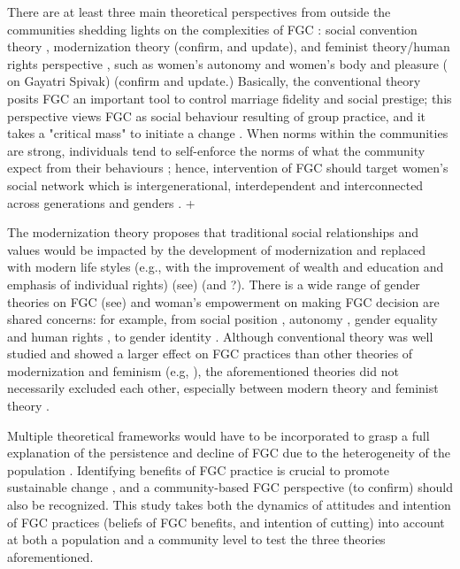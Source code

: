 \documentclass[12pt,]{article}
\begin{document}
There are at least three main theoretical perspectives from outside the communities
shedding lights on the complexities of FGC \cite{Hayf05, Youn02}:  social convention theory \cite{Mack96, Mack00, Mack06, MackLeJe09, DuncWand11}, modernization theory\cite{BoylMcMo02, Youn02} (confirm, and update), and feminist theory/human rights perspective \cite{Dell04, FrieMahm13,KhosBane17, Lewi95, Lewi09, Meye00, Morr08, Njam04, UNIC16, YirgKass12, Youn02}, such as women's autonomy \cite{Meye00} and women's body and pleasure (\cite{Morr08} on Gayatri Spivak) (confirm and update.)  Basically, the conventional theory posits FGC an important tool to control marriage fidelity and social prestige; this perspective views FGC as social behaviour resulting of group practice, and it takes a "critical mass" to initiate a change \cite{Mack00, MackLeJe09}.  When norms within the communities are strong, individuals tend to self-enforce the norms of what the community expect from their behaviours \cite{Ajze02, Hayf05, KandNwak09, Mack96, Mack06, MackLeJe09, ThomMadd92}; hence, intervention of FGC should target women's social network which is intergenerational, interdependent and interconnected across generations and genders \cite{Mack00, DuncWand11}.
+ \cite{Shel-Wand11}

The modernization theory proposes that traditional social relationships and values would be impacted by the development of modernization and replaced with modern life styles (e.g., with the improvement of wealth and education and emphasis of individual rights) (see\cite{Moor13}) (and \cite{BoylMcMo02, Youn02}?).  There is a wide range of gender theories on FGC (see\cite{Anti13, Hodg11, Lewi95}) and woman’s empowerment on making FGC decision are shared concerns:  for example, from social position \cite{VanMeek15}, autonomy \cite{Meye00}, gender equality and human rights \cite{Drol11}, to gender identity \cite{Youn04, Koom14, WintKoom09}.  Although conventional theory was well studied and showed a larger effect on FGC practices than other theories of modernization and feminism (e.g, \cite{BoylMcMo02, BoylCorl10, FreyJohn07, FrieMahm13, Hayf05, KandMwek09, Mack96, Mack06, ReigGonz14, YirgKass12}), the aforementioned theories did not necessarily excluded each other, especially between modern theory and feminist theory \cite{Hayf05}.

Multiple theoretical frameworks would have to be incorporated to grasp a full explanation of the persistence and decline of FGC due to the heterogeneity of the population \cite{Hayf05, EffeVogt15, ModrLiu13}.  Identifying benefits of FGC practice is crucial to promote sustainable change \cite{EffeVogt15}, and a community-based FGC perspective \cite{BoylCorl010, Drol11,Hayf05, Grue05, Hodg11, KandNwak09, OdukAfol17} (to confirm) should also be recognized.  This study takes both the dynamics of attitudes and intention of FGC practices (beliefs of FGC benefits, and intention of cutting) into account at both a population and a community level to test the three theories aforementioned.
\end{document}
